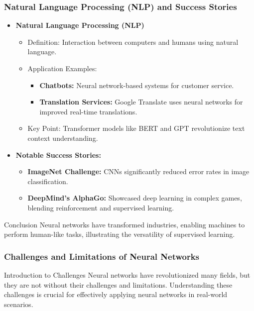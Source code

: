 \documentclass[aspectratio=169]{beamer}
\begin{document}
\begin{frame}[fragile]
    \frametitle{Natural Language Processing (NLP) and Success Stories}
    \begin{itemize}
        \item \textbf{Natural Language Processing (NLP)}
            \begin{itemize}
                \item Definition: Interaction between computers and humans using natural language.
                \item Application Examples:
                    \begin{itemize}
                        \item \textbf{Chatbots:} Neural network-based systems for customer service.
                        \item \textbf{Translation Services:} Google Translate uses neural networks for improved real-time translations.
                    \end{itemize}
                \item Key Point: Transformer models like BERT and GPT revolutionize text context understanding.
            \end{itemize}

        \item \textbf{Notable Success Stories:}
            \begin{itemize}
                \item \textbf{ImageNet Challenge:} CNNs significantly reduced error rates in image classification.
                \item \textbf{DeepMind's AlphaGo:} Showcased deep learning in complex games, blending reinforcement and supervised learning.
            \end{itemize}
    \end{itemize}

    \begin{block}{Conclusion}
        Neural networks have transformed industries, enabling machines to perform human-like tasks, illustrating the versatility of supervised learning.
    \end{block}
\end{frame}

\begin{frame}[fragile]
    \frametitle{Challenges and Limitations of Neural Networks}
    \begin{block}{Introduction to Challenges}
        Neural networks have revolutionized many fields, but they are not without their challenges and limitations. Understanding these challenges is crucial for effectively applying neural networks in real-world scenarios.
    \end{block}
\end{frame}
\end{document}
